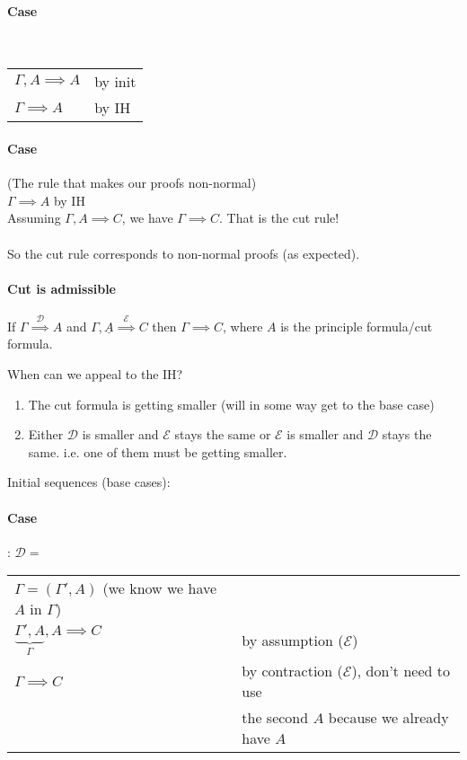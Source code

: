 \documentclass[12 pt]{article}
\begin{document}
       \paragraph{Case} \DP
       \\
       \begin{tabular}{l l}
         $\Gamma, A \implies A$& by init
         \\ $\Gamma \implies A$ & by IH
       \end{tabular}
       \paragraph{Case} \DP
       (The rule that makes our proofs non-normal)
       \\
         $\Gamma \implies A$ by IH
         \\ Assuming $\Gamma, A \implies C$, we have $\Gamma \implies C$. That is the cut rule!
         \\\DP  
         \\ So the cut rule corresponds to non-normal proofs (as
         expected).
         \paragraph{Cut is admissible} If $\Gamma \stackrel{\mathcal{D}}{\implies} A$ and
         $\Gamma, \underline{A} \stackrel{\mathcal{E}}{\implies} C$ then $\Gamma \implies C$,
         where $A$ is the principle formula/cut formula.

         When can we appeal to the IH?
         \begin{enumerate}
         \item The cut formula is getting smaller (will in some way
           get to the base case)
         \item Either $\mathcal{D}$ is smaller and $\mathcal{E}$ stays
           the same or $\mathcal{E}$ is smaller and $\mathcal{D}$
           stays the same. i.e. one of them must be getting smaller.
         \end{enumerate}
         Initial sequences (base cases):
         \paragraph{Case}: $\mathcal{D} = $ \DP
         \\
         \begin{tabular}{l l}
           $\Gamma = (\Gamma', A)$ (we know we have $A$ in $\Gamma$)&
           \\ $\underbrace{\Gamma', A}_{\Gamma}, A \implies C$ & by assumption ($\mathcal{E}$)
           \\ $\Gamma \implies C$ & by contraction ($\mathcal{E}$), don't need to use
           \\ & the second $A$ because we already have $A$
         \end{tabular}
\end{document}
